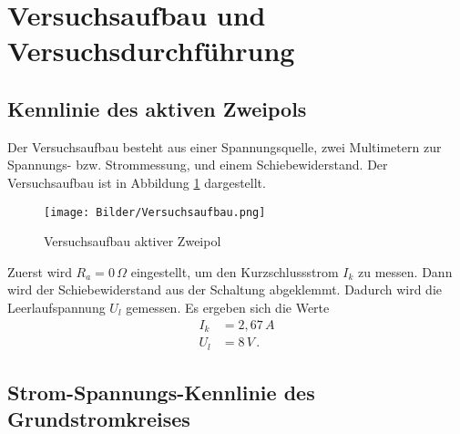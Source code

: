 \section{Versuchsaufbau und Versuchsdurchführung}

\subsection{Kennlinie des aktiven Zweipols}
Der Versuchsaufbau besteht aus einer Spannungsquelle, zwei Multimetern zur Spannungs- bzw. Strommessung, und einem Schiebewiderstand. Der Versuchsaufbau ist in Abbildung \ref{fig:versuchsaufbau} dargestellt.
\begin{figure}[ht]
    \centering
    \texttt{[image: Bilder/Versuchsaufbau.png]}
    \caption{Versuchsaufbau aktiver Zweipol}
    \label{fig:versuchsaufbau}
\end{figure}

Zuerst wird $R_a=0\,\Omega$ eingestellt, um den Kurzschlussstrom $I_k$ zu messen. Dann wird der Schiebewiderstand aus der Schaltung abgeklemmt. Dadurch wird die Leerlaufspannung $U_l$ gemessen.
Es ergeben sich die Werte
\begin{align*}
    I_k & = 2,67\,A  \\
    U_l & = 8\,V\, .
\end{align*}

\subsection{Strom-Spannungs-Kennlinie des Grundstromkreises}

